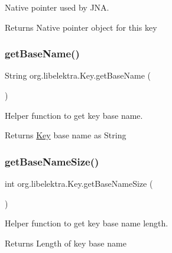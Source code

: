 Native pointer used by J\+NA. 

\begin{DoxyReturn}{Returns}
Native pointer object for this key 
\end{DoxyReturn}
\mbox{\label{classorg_1_1libelektra_1_1Key_a32c556682f808bbc0a4b676879f6b86f}} 
\subsubsection{\texorpdfstring{get\+Base\+Name()}{getBaseName()}}
{\footnotesize\ttfamily String org.\+libelektra.\+Key.\+get\+Base\+Name (\begin{DoxyParamCaption}{ }\end{DoxyParamCaption})\hspace{0.3cm}{\ttfamily [inline]}}



Helper function to get key base name. 

\begin{DoxyReturn}{Returns}
\hyperlink{classorg_1_1libelektra_1_1Key}{Key} base name as String 
\end{DoxyReturn}
\mbox{\label{classorg_1_1libelektra_1_1Key_a24bd83bcae08b956150d8ae3dafe738e}} 
\subsubsection{\texorpdfstring{get\+Base\+Name\+Size()}{getBaseNameSize()}}
{\footnotesize\ttfamily int org.\+libelektra.\+Key.\+get\+Base\+Name\+Size (\begin{DoxyParamCaption}{ }\end{DoxyParamCaption})\hspace{0.3cm}{\ttfamily [inline]}}



Helper function to get key base name length. 

\begin{DoxyReturn}{Returns}
Length of key base name 
\end{DoxyReturn}
\mbox{\label{classorg_1_1libelektra_1_1Key_a9841edcf6c48799c77d8db3b82189abc}} 
